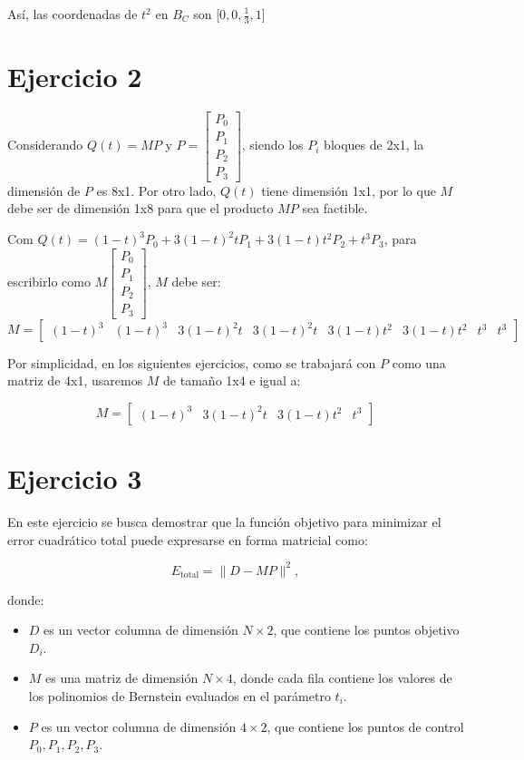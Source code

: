 \documentclass{article}
\begin{document}
Así, las coordenadas de $t^2$ en $B_C$ son [$0, 0, \frac{1}{3}, 1$]

\section*{Ejercicio 2}
Considerando $Q(t) = MP$ y $P = \begin{bmatrix}P_0 \\ P_1 \\ P_2 \\ P_3\end{bmatrix}$, siendo los $P_i$ bloques de 2x1, la dimensión de $P$ es 8x1. Por otro lado, $Q(t)$ tiene dimensión 1x1, por lo que $M$ debe ser de dimensión 1x8 para que el producto $MP$ sea factible.

Com $Q(t) = (1 - t)^3 P_0 + 3(1 - t)^2 t P_1 + 3(1 - t) t^2 P_2 + t^3 P_3$, para escribirlo como $M \begin{bmatrix}P_0 \\ P_1 \\ P_2 \\ P_3\end{bmatrix}$, $M$ debe ser:
$$
M = \begin{bmatrix} (1 - t)^3 & (1 - t)^3 & 3(1 - t)^2 t & 3(1 - t)^2 t & 3(1 - t) t^2 & 3(1 - t) t^2 & t^3 & t^3 \end{bmatrix}
$$

Por simplicidad, en los siguientes ejercicios, como se trabajará con $P$ como una matriz de 4x1, usaremos $M$ de tamaño 1x4 e igual a:

$$
M = \begin{bmatrix} (1 - t)^3 & 3(1 - t)^2 t & 3(1 - t) t^2 & t^3 \end{bmatrix}
$$

\section*{Ejercicio 3}

En este ejercicio se busca demostrar que la función objetivo para minimizar el error cuadrático total puede expresarse en forma matricial como:

\[
E_{\text{total}} = \|D - MP\|^2,
\]

donde:
\begin{itemize}
    \item \( D \) es un vector columna de dimensión \( N \times 2 \), que contiene los puntos objetivo \( D_i \).
    \item \( M \) es una matriz de dimensión \( N \times 4 \), donde cada fila contiene los valores de los polinomios de Bernstein evaluados en el parámetro \( t_i \).
    \item \( P \) es un vector columna de dimensión \( 4 \times 2 \), que contiene los puntos de control \( P_0, P_1, P_2, P_3 \).
\end{itemize}
\end{document}
